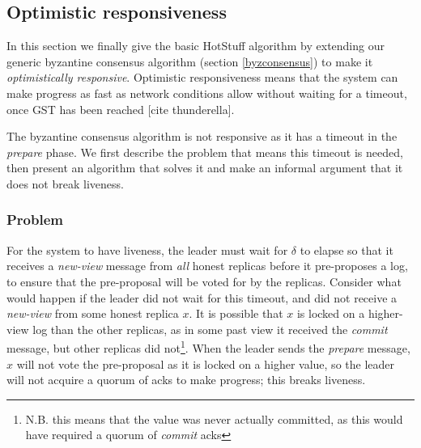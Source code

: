 \subsection{Optimistic responsiveness} \label{optresponsive}
In this section we finally give the basic HotStuff algorithm by extending our generic byzantine consensus algorithm (section \ref{byzconsensus}) to make it \textit{optimistically responsive}. Optimistic responsiveness means that the system can make progress as fast as network conditions allow without waiting for a timeout, once GST has been reached [cite thunderella].

The byzantine consensus algorithm is not responsive as it has a timeout in the \textit{prepare} phase. We first describe the problem that means this timeout is needed, then present an algorithm that solves it and make an informal argument that it does not break liveness.

\subsubsection{Problem}
For the system to have liveness, the leader must wait for $\delta$ to elapse so that it receives a \textit{new-view} message from \textit{all} honest replicas before it pre-proposes a log, to ensure that the pre-proposal will be voted for by the replicas. Consider what would happen if the leader did not wait for this timeout, and did not receive a \textit{new-view} from some honest replica $x$. It is possible that $x$ is locked on a higher-view log than the other replicas, as in some past view it received the \textit{commit} message, but other replicas did not\footnote{N.B. this means that the value was never actually committed, as this would have required a quorum of \textit{commit} acks}. When the leader sends the \textit{prepare} message, $x$ will not vote the pre-proposal as it is locked on a higher value, so the leader will not acquire a quorum of acks to make progress; this breaks liveness.


